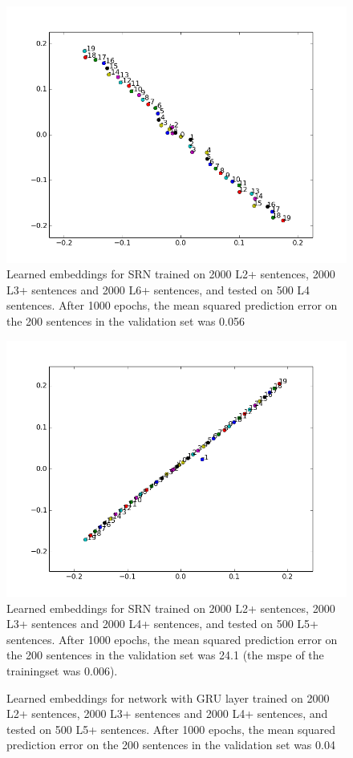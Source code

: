 \documentclass{article}
\begin{document}
\begin{figure}[!ht]
        \includegraphics[scale=0.8]{SRN_L2L3L6.png}
        \caption{Learned embeddings for SRN trained on 2000 L2+ sentences, 2000 L3+ sentences and 2000 L6+ sentences, and tested on 500 L4 sentences. After 1000 epochs, the mean squared prediction error on the 200 sentences in the validation set was 0.056}\label{fig:SRN_L2L3L6_testL5}
\end{figure}

\begin{figure}[!ht]
        \includegraphics[scale=0.8]{SRN_L2L3L4.png}
        \caption{Learned embeddings for SRN trained on 2000 L2+ sentences, 2000 L3+ sentences and 2000 L4+ sentences, and tested on 500 L5+ sentences. After 1000 epochs, the mean squared prediction error on the 200 sentences in the validation set was 24.1 (the mspe of the trainingset was 0.006).}\label{fig:trainingL2L3L4_testL5}
\end{figure}

\begin{figure}[!ht]
        \caption{Learned embeddings for network with GRU layer trained on 2000 L2+ sentences, 2000 L3+ sentences and 2000 L4+ sentences, and tested on 500 L5+ sentences. After 1000 epochs, the mean squared prediction error on the 200 sentences in the validation set was 0.04}\label{fig:GRU_L2L3L4}
\end{figure}
\end{document}
